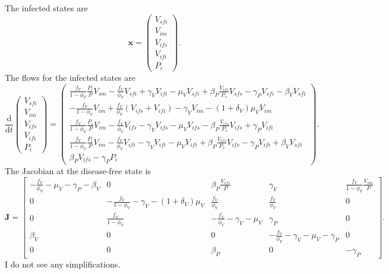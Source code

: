 \documentclass{article}
\newcommand{\md}{\mathrm{d}}
\newcommand{\mat}[1]{\mathbf{#1}}
\renewcommand{\vec}[1]{\mathbf{#1}}
\begin{document}
The infected states are
\begin{equation}
  \vec{x} =
  \begin{pmatrix}
    V_{sfi}
    \\
    V_{im}
    \\
    V_{ifs}
    \\
    V_{ifi}
    \\
    P_i
  \end{pmatrix}.
\end{equation}
The flows for the infected states are
\begin{equation}
  \frac{\md}{\md t}
  \begin{pmatrix}
    V_{sfi}
    \\
    V_{im}
    \\
    V_{ifs}
    \\
    V_{ifi}
    \\
    P_i
  \end{pmatrix}
  =
  \begin{pmatrix}
    \frac{f_V}{1 - \phi_V} \frac{P_i}{P} V_{sm}
    - \frac{f_V}{\phi_V} V_{sfi}
    + \gamma_V V_{ifi}
    - \mu_V V_{sfi}
    + \beta_P \frac{V_{ifs}}{P_s} V_{sfs}
    - \gamma_P V_{sfi}
    - \beta_V V_{sfi}
    \\
    - \frac{f_V}{1 - \phi_V} V_{im}
    + \frac{f_V}{\phi_V} (V_{ifs} + V_{ifi})
    - \gamma_V V_{im}
    - (1 + \delta_V) \mu_V V_{im}
    \\
    \frac{f_V}{1 - \phi_V} \frac{P_s}{P} V_{im}
    - \frac{f_V}{\phi_V} V_{ifs}
    - \gamma_V V_{ifs}
    - \mu_V V_{ifs}
    - \beta_P \frac{V_{ifs}}{P_s} V_{ifs}
    + \gamma_P V_{ifi}
    \\
    \frac{f_V}{1 - \phi_V} \frac{P_i}{P} V_{im}
    - \frac{f_V}{\phi_V} V_{ifi}
    - \gamma_V V_{ifi}
    - \mu_V V_{ifi}
    + \beta_P \frac{V_{ifs}}{P_s} V_{ifs}
    - \gamma_P V_{ifi}
    + \beta_V V_{sfi}
    \\
    \beta_P V_{ifs}
    - \gamma_P P_i
  \end{pmatrix}.
\end{equation}
The Jacobian at the disease-free state is
\begin{equation}
  \mat{J} =
  \begin{bmatrix}
    - \frac{f_V}{\phi_V}
    - \mu_V
    - \gamma_P
    - \beta_V
    &
    0
    &
    \beta_P \frac{V_{sfs}}{P}
    &
    \gamma_V
    &
    \frac{f_V}{1 - \phi_V} \frac{V_{sm}}{P}
    \\
    0
    &
    - \frac{f_V}{1 - \phi_V}
    - \gamma_V
    - (1 + \delta_V) \mu_V
    &
    \frac{f_V}{\phi_V}
    &
    \frac{f_V}{\phi_V}
    &
    0
    \\
    0
    &
    \frac{f_V}{1 - \phi_V}
    &
    - \frac{f_V}{\phi_V}
    - \gamma_V
    - \mu_V
    &
    \gamma_P
    &
    0
    \\
    \beta_V
    &
    0
    &
    0
    &
    - \frac{f_V}{\phi_V}
    - \gamma_V
    - \mu_V
    - \gamma_P
    &
    0
    \\
    0
    &
    0
    &
    \beta_P
    &
    0
    &
    - \gamma_P
  \end{bmatrix}.
\end{equation}
I do not see any simplifications.
\end{document}
